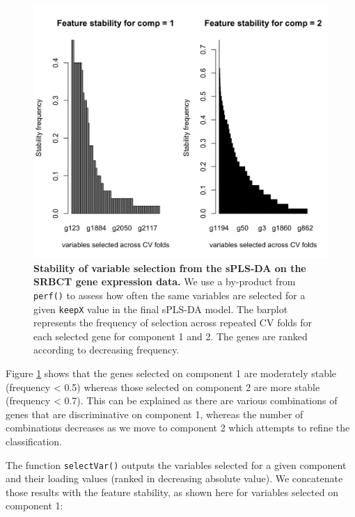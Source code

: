 \documentclass[]{book}
\begin{document}
\begin{figure}

{\centering \includegraphics[width=0.5\linewidth]{Figures/PLSDA/splsda-stability-1} 

}

\caption{\textbf{Stability of variable selection from the
sPLS-DA on the SRBCT gene expression data.} We use a by-product from
\texttt{perf()} to assess how often the same variables are selected for
a given \texttt{keepX} value in the final sPLS-DA model. The barplot
represents the frequency of selection across repeated CV folds for each
selected gene for component 1 and 2. The genes are ranked according to
decreasing frequency.}\label{fig:splsda-stability}
\end{figure}









Figure \ref{fig:splsda-stability} shows that the genes selected on
component 1 are moderately stable (frequency \textless{} 0.5) whereas
those selected on component 2 are more stable (frequency \textless{}
0.7). This can be explained as there are various combinations of genes
that are discriminative on component 1, whereas the number of
combinations decreases as we move to component 2 which attempts to
refine the classification.

The function \texttt{selectVar()} outputs the variables selected for a
given component and their loading values (ranked in decreasing absolute
value). We concatenate those results with the feature stability, as
shown here for variables selected on component 1:
\end{document}
